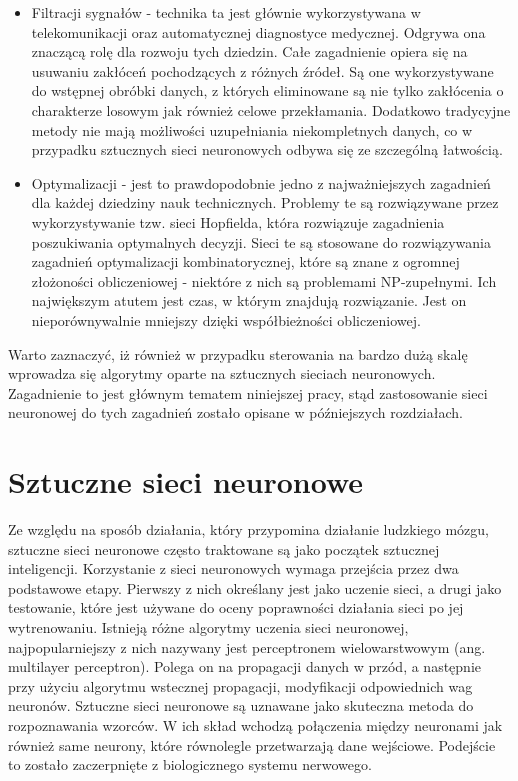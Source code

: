 \begin{itemize}
	\item Filtracji sygnałów - technika ta jest głównie wykorzystywana w telekomunikacji oraz automatycznej diagnostyce medycznej. Odgrywa ona znaczącą rolę dla rozwoju tych dziedzin. Całe zagadnienie opiera się na usuwaniu zakłóceń pochodzących z różnych źródeł. Są one wykorzystywane do wstępnej obróbki danych, z których eliminowane są nie tylko zakłócenia o charakterze losowym jak również celowe przekłamania. Dodatkowo tradycyjne metody nie mają możliwości uzupełniania niekompletnych danych, co w przypadku sztucznych sieci neuronowych odbywa się ze szczególną łatwością.
	\item Optymalizacji - jest to prawdopodobnie jedno z najważniejszych zagadnień dla każdej dziedziny nauk technicznych. Problemy te są rozwiązywane przez wykorzystywanie tzw. sieci Hopfielda, która rozwiązuje zagadnienia poszukiwania optymalnych decyzji. Sieci te są stosowane do rozwiązywania zagadnień optymalizacji kombinatorycznej, które są znane z ogromnej złożoności obliczeniowej - niektóre z nich są problemami NP-zupełnymi. Ich największym atutem jest czas, w którym znajdują rozwiązanie. Jest on nieporównywalnie mniejszy dzięki współbieżności obliczeniowej. 
\end{itemize}

Warto zaznaczyć, iż również w przypadku sterowania na bardzo dużą skalę wprowadza się algorytmy oparte na sztucznych sieciach neuronowych. Zagadnienie to jest głównym tematem niniejszej pracy, stąd zastosowanie sieci neuronowej do tych zagadnień zostało opisane w późniejszych rozdziałach.

\section{Sztuczne sieci neuronowe}
Ze względu na sposób działania, który przypomina działanie ludzkiego mózgu, sztuczne sieci neuronowe często traktowane są jako początek sztucznej inteligencji. Korzystanie z sieci neuronowych wymaga przejścia przez dwa podstawowe etapy. Pierwszy z nich określany jest jako uczenie sieci, a drugi jako testowanie, które jest używane do oceny poprawności działania sieci po jej wytrenowaniu. Istnieją różne algorytmy uczenia sieci neuronowej, najpopularniejszy z nich nazywany jest perceptronem wielowarstwowym (ang. multilayer perceptron). Polega on na propagacji danych w przód, a następnie przy użyciu algorytmu wstecznej propagacji, modyfikacji odpowiednich wag neuronów. Sztuczne sieci neuronowe są uznawane jako skuteczna metoda do rozpoznawania wzorców. W ich skład wchodzą połączenia między neuronami jak również same neurony, które równolegle przetwarzają dane wejściowe. Podejście to zostało zaczerpnięte z biologicznego systemu nerwowego.

